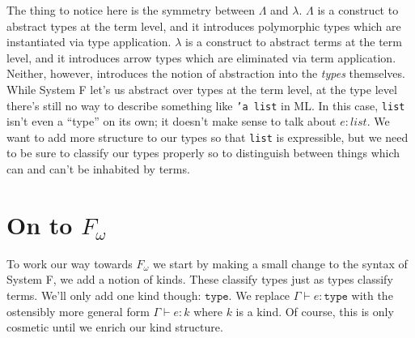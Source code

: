 \documentclass{amsart}
\newcommand{\type}{\ensuremath{\mathtt{type}}}
\begin{document}

The thing to notice here is the symmetry between $\Lambda$ and $\lambda$.
$\Lambda$ is a construct to abstract types at the term level, and it
introduces polymorphic types which are instantiated via type application.
$\lambda$ is a construct to abstract terms at the term level, and it
introduces arrow types which are eliminated via term application. Neither,
however, introduces the notion of abstraction into the \emph{types}
themselves. While System F let's us abstract over types at the term level, at
the type level there's still no way to describe something like {\tt 'a list}
in ML. In this case, {\tt list} isn't even a ``type'' on its own; it doesn't
make sense to talk about $e : list$. We want to add more structure to our
types so that {\tt list} is expressible, but we need to be sure to classify
our types properly so to distinguish between things which can and can't be
inhabited by terms.

\section{On to $F_\omega$}

To work our way towards $F_\omega$ we start by making a small change
to the syntax of System F, we add a notion of kinds. These classify
types just as types classify terms. We'll only add one kind though:
\type. We replace $\Gamma \vdash e : \type$ with the ostensibly more
general form $\Gamma \vdash e : k$ where $k$ is a kind. Of course,
this is only cosmetic until we enrich our kind structure.
\end{document}

